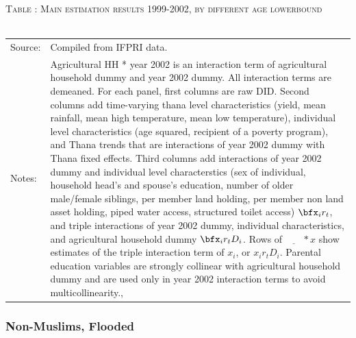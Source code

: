 \begin{table}\hfil\textsc{\footnotesize Table \thetable: Main estimation results 1999-2002, by different age lowerbound\label{zEm.1999.10.sameN}}\\\setlength{\tabcolsep}{.5pt}\renewcommand{\arraystretch}{.675}\hspace{-2em}\hfil\\\renewcommand{\arraystretch}{1}\hfil\begin{tabular}{>{\hfill\scriptsize}p{1cm}<{}>{\scriptsize}p{12cm}<{\hfill}} Source:& Compiled from IFPRI data. \\[-1ex] Notes:&   \textsf{Agricultural HH * year 2002} is an interaction term of agricultural household dummy and year 2002 dummy. All interaction terms are demeaned. For each panel, first columns are raw DID. Second columns add time-varying thana level characteristics (yield, mean rainfall, mean high temperature, mean low temperature), individual level characteristics (age squared, recipient of a poverty program), and \textsf{Thana trends} that are interactions of year 2002 dummy with Thana fixed effects. Third columns add interactions of year 2002 dummy and individual level characterstics (sex of individual, household head's and spouse's education, number of older male/female siblings, per member land holding, per member non land asset holding, piped water access, structured toilet access) $\bfx_{i}r_{t}$, and triple interactions of year 2002 dummy, individual characteristics, and agricultural household dummy $\bfx_{i}r_{t}D_{i}$. Rows of $\underline{\phantom{mm}}*x$ show estimates of the triple interaction term of $x_{i}$, or $x_{i}r_{t}D_{i}$. Parental education variables are strongly collinear with agricultural household dummy and are used only in year 2002 interaction terms to avoid multicollinearity., \\   \end{tabular} \end{table}

\clearpage
\subsubsection{Non-Muslims, Flooded}

